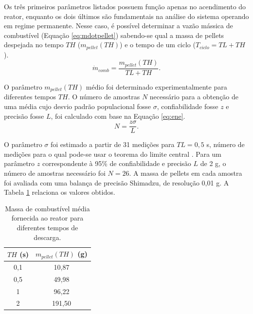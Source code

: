 Os três primeiros parâmetros listados possuem função apenas no acendimento do reator, enquanto os dois últimos são fundamentais na análise do sistema operando em regime permanente. Nesse caso, é possível determinar a vazão mássica de combustível (Equação \eqref{eq:mdotpellet}) sabendo-se qual a massa de pellets despejada no tempo $TH$ ($m_{pellet} (TH)$) e o tempo de um ciclo ($T_{ciclo} = TL + TH$).
\begin{equation} \label{eq:mdotpellet}
\dot{m}_{comb} = \frac{m_{pellet} (TH)}{TL + TH}.
\end{equation}

O parâmetro $m_{pellet}(TH)$ médio foi determinado experimentalmente para diferentes tempos $TH$. O número de amostras $N$ necessário para a obtenção de uma média cujo desvio padrão populacional fosse $\sigma$, confiabilidade fosse $z$ e precisão fosse $L$, foi calculado com base na Equação \eqref{eq:ene}.
\begin{equation} \label{eq:ene}
N = \frac{z\sigma}{L}.
\end{equation}

O parâmetro $\sigma$ foi estimado a partir de 31 medições para $TL = 0,5$ s, número de medições para o qual pode-se usar o teorema do limite central \cite{Devore}. Para um parâmetro $z$ correspondente à 95\% de confiabilidade e precisão $L$ de 2 g, o número de amostras necessário foi $N=26$. A massa de pellets em cada amostra foi avaliada com uma balança de precisão Shimadzu, de resolução 0,01 g. A Tabela \ref{tab:mdot} relaciona os valores obtidos.

\begin{table}[!ht]
	\centering
	\small
	\renewcommand{\arraystretch}{1.3}
	\caption{Massa de combustível média fornecida ao reator para diferentes tempos de descarga.}%
	\label{tab:mdot}
        \begin{tabular}{|c|c|}
        \hline
        $TH$ (s) & $m_{pellet}(TH)$ (g)    \\ \hline
        0,1    & 10,87                     \\ \hline
        0,5    & 49,98                     \\ \hline
        1      & 96,22                     \\ \hline
        2      & 191,50                    \\ \hline
        \end{tabular}
    \vspace{2mm}
\end{table}

